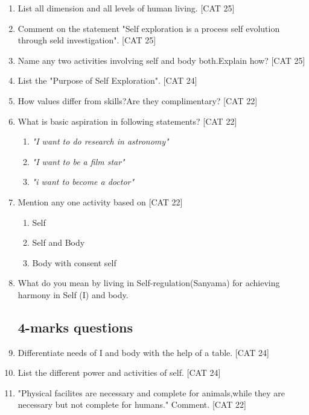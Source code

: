 \documentclass[12pt]{article}
\begin{document}
\begin{enumerate}
		\item List all dimension and all levels of human living. \hfill{[CAT 25]}
	
		\item Comment on the statement "Self exploration is a process self evolution through seld investigation". \hfill{[CAT 25]}
		
		\item Name any two activities involving self and body both.Explain how? \hfill{[CAT 25]}
		
		\item List the "Purpose of Self Exploration". \hfill{[CAT 24]}
		
		\item How values differ from skills?Are they complimentary? \hfill{[CAT 22]}
		
		\item What is basic aspiration in following statements? \hfill{[CAT 22]}
		\begin{enumerate}
			\item \textit{"I want to do research in astronomy"}
			\item \textit{"I want to be a film star"}
			\item \textit{"i want to become a doctor"}
		\end{enumerate}
		
		\item Mention any one activity based on \hfill{[CAT 22]}
		\begin{enumerate}
			\item Self
			\item Self and Body
			\item Body with consent self
		\end{enumerate}
		
		\item What do you mean by living in Self-regulation(Sanyama) for achieving harmony in Self (I) and body.
		
		
		\subsection{4-marks questions}

		\item Differentiate needs of I and body with the help of a table. \hfill{[CAT 24]}
		
		\item List the different power and activities of self. \hfill{[CAT 24]}
		
		\item "Physical facilites are necessary and complete for animals,while they are necessary but not complete for humans." Comment. \hfill{[CAT 22]}
		

\end{enumerate}
\end{document}
